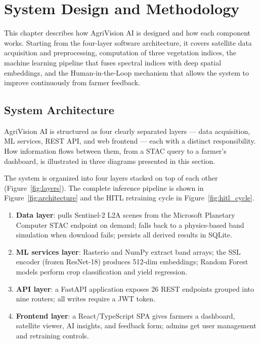 \documentclass[12pt,a4paper,oneside]{report}
\begin{document}
\chapter{System Design and Methodology}

This chapter describes how AgriVision AI is designed and how each component works. Starting from the four-layer software architecture, it covers satellite data acquisition and preprocessing, computation of three vegetation indices, the machine learning pipeline that fuses spectral indices with deep spatial embeddings, and the Human-in-the-Loop mechanism that allows the system to improve continuously from farmer feedback.

\section{System Architecture}
\label{sec:architecture}

AgriVision AI is structured as four clearly separated layers — data acquisition, ML services, REST API, and web frontend — each with a distinct responsibility. How information flows between them, from a STAC query to a farmer's dashboard, is illustrated in three diagrams presented in this section.

The system is organized into four layers stacked on top of each other
(Figure~\ref{fig:layers}). The complete inference pipeline is shown in
Figure~\ref{fig:architecture} and the HITL retraining cycle in
Figure~\ref{fig:hitl_cycle}.

\begin{enumerate}
  \item \textbf{Data layer}: pulls Sentinel-2 L2A scenes from the Microsoft
        Planetary Computer STAC endpoint on demand; falls back to a
        physics-based band simulation when download fails; persists all
        derived results in SQLite.
  \item \textbf{ML services layer}: Rasterio and NumPy extract band arrays;
        the SSL encoder (frozen ResNet-18) produces 512-dim embeddings;
        Random Forest models perform crop classification and yield regression.
  \item \textbf{API layer}: a FastAPI application exposes 26 REST endpoints
        grouped into nine routers; all writes require a JWT token.
  \item \textbf{Frontend layer}: a React/TypeScript SPA gives farmers a
        dashboard, satellite viewer, AI insights, and feedback form;
        admins get user management and retraining controls.
\end{enumerate}
\end{document}
